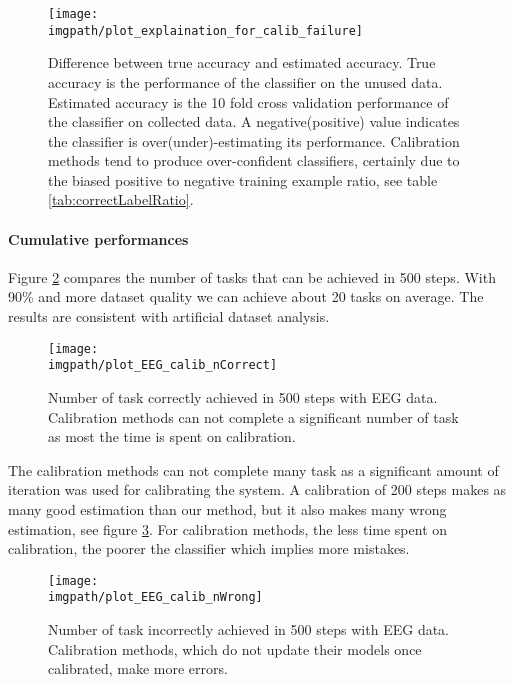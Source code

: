 \begin{figure}[!ht]
\centering
\texttt{[image: \\imgpath/plot\_explaination\_for\_calib\_failure]}
\caption{Difference between true accuracy and estimated accuracy. True accuracy is the performance of the classifier on the unused data. Estimated accuracy is the 10 fold cross validation performance of the classifier on collected data. A negative(positive) value indicates the classifier is over(under)-estimating its performance. Calibration methods tend to produce over-confident classifiers, certainly due to the biased positive to negative training example ratio, see table \ref{tab:correctLabelRatio}.}
\label{fig:calibFail}
\end{figure}

\paragraph{Cumulative performances}

Figure \ref{fig:nCorrectEEG} compares the number of tasks that can be achieved in 500 steps. With 90\% and more dataset quality we can achieve about 20 tasks on average. The results are consistent with artificial dataset analysis.

\begin{figure}[!ht]
\centering
\texttt{[image: \\imgpath/plot\_EEG\_calib\_nCorrect]}
\caption{Number of task correctly achieved in 500 steps with EEG data. Calibration methods can not complete a significant number of task as most the time is spent on calibration.}
\label{fig:nCorrectEEG}
\end{figure} 

The calibration methods can not complete many task as a significant amount of iteration was used for calibrating the system. A calibration of 200 steps makes as many good estimation than our method, but it also makes many wrong estimation, see figure \ref{fig:nWrongEEG}. For calibration methods, the less time spent on calibration, the poorer the classifier which implies more mistakes.

\begin{figure}[!ht]
\centering
\texttt{[image: \\imgpath/plot\_EEG\_calib\_nWrong]}
\caption{Number of task incorrectly achieved in 500 steps with EEG data. Calibration methods, which do not update their models once calibrated, make more errors.}
\label{fig:nWrongEEG}
\end{figure}

